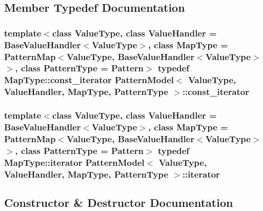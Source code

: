 \subsection{Member Typedef Documentation}
\hypertarget{classPatternModel_a6809324b33b5ea832f0f15d25db0b46b}{}
\subsubsection[{const\+\_\+iterator}]{\setlength{\rightskip}{0pt plus 5cm}template$<$class Value\+Type, class Value\+Handler = Base\+Value\+Handler$<$\+Value\+Type$>$, class Map\+Type = Pattern\+Map$<$\+Value\+Type, Base\+Value\+Handler$<$\+Value\+Type$>$$>$, class Pattern\+Type = Pattern$>$ typedef Map\+Type\+::const\+\_\+iterator {\bf Pattern\+Model}$<$ Value\+Type, Value\+Handler, Map\+Type, {\bf Pattern\+Type} $>$\+::{\bf const\+\_\+iterator}}\label{classPatternModel_a6809324b33b5ea832f0f15d25db0b46b}
\hypertarget{classPatternModel_a9254a562bb22d604b6338c6b2fce76e5}{}
\subsubsection[{iterator}]{\setlength{\rightskip}{0pt plus 5cm}template$<$class Value\+Type, class Value\+Handler = Base\+Value\+Handler$<$\+Value\+Type$>$, class Map\+Type = Pattern\+Map$<$\+Value\+Type, Base\+Value\+Handler$<$\+Value\+Type$>$$>$, class Pattern\+Type = Pattern$>$ typedef Map\+Type\+::iterator {\bf Pattern\+Model}$<$ Value\+Type, Value\+Handler, Map\+Type, {\bf Pattern\+Type} $>$\+::{\bf iterator}}\label{classPatternModel_a9254a562bb22d604b6338c6b2fce76e5}


\subsection{Constructor \& Destructor Documentation}
\hypertarget{classPatternModel_afc90f7dd876f3c602348275380503037}{}
